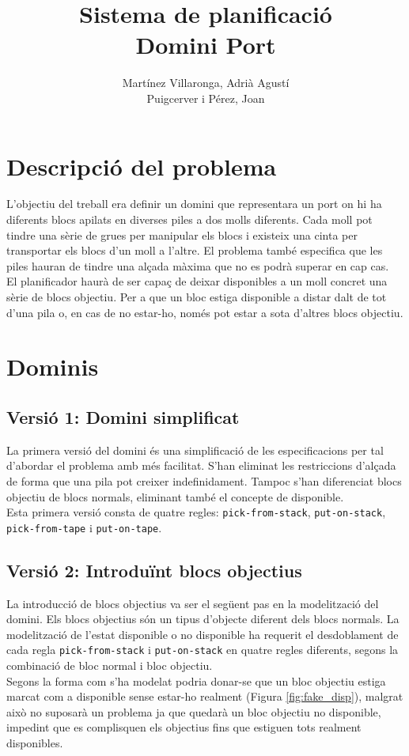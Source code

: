 \documentclass[10pt,a4paper]{article}
\author{Martínez Villaronga, Adrià Agustí\\Puigcerver i Pérez, Joan}
\title{Sistema de planificació\\Domini Port}
\begin{document}
\maketitle
\section*{Descripció del problema}
L'objectiu del treball era definir un domini que representara un port
on hi ha diferents blocs apilats en diverses piles a dos molls diferents.
Cada moll pot tindre una sèrie de grues per manipular els blocs i existeix
una cinta per transportar els blocs d'un moll a l'altre. El problema
també especifica que les piles hauran de tindre una alçada màxima
que no es podrà superar en cap cas.\\
El planificador haurà de ser capaç de deixar disponibles a un moll
concret una sèrie de blocs objectiu. Per a que un bloc estiga
disponible a distar dalt de tot d'una pila o, en cas de no estar-ho,
només pot estar a sota d'altres blocs objectiu.
\section*{Dominis}
\subsection*{Versió 1: Domini simplificat}
La primera versió del domini és una simplificació de les especificacions
per tal d'abordar el problema amb més facilitat. S'han eliminat les restriccions
d'alçada de forma que una pila pot creixer indefinidament. Tampoc s'han diferenciat
blocs objectiu de blocs normals, eliminant també el concepte de disponible.\\
Esta primera versió consta de quatre regles: \texttt{pick-from-stack}, \texttt{put-on-stack},
\texttt{pick-from-tape} i \texttt{put-on-tape}.

\subsection*{Versió 2: Introduïnt blocs objectius}
La introducció de blocs objectius va ser el següent pas en la modelització del domini.
Els blocs objectius són un tipus d'objecte diferent dels blocs normals. La modelització
de l'estat disponible o no disponible ha requerit el desdoblament de cada regla
\texttt{pick-from-stack} i \texttt{put-on-stack} en quatre regles diferents,
segons la combinació de bloc normal i bloc objectiu.\\
Segons la forma com s'ha modelat podria donar-se que un bloc objectiu estiga marcat
com a disponible sense estar-ho realment (Figura \ref{fig:fake_disp}), malgrat això
no suposarà un problema ja que quedarà un bloc objectiu no disponible, impedint
que es complisquen els objectius fins que estiguen tots realment disponibles.
\end{document}
